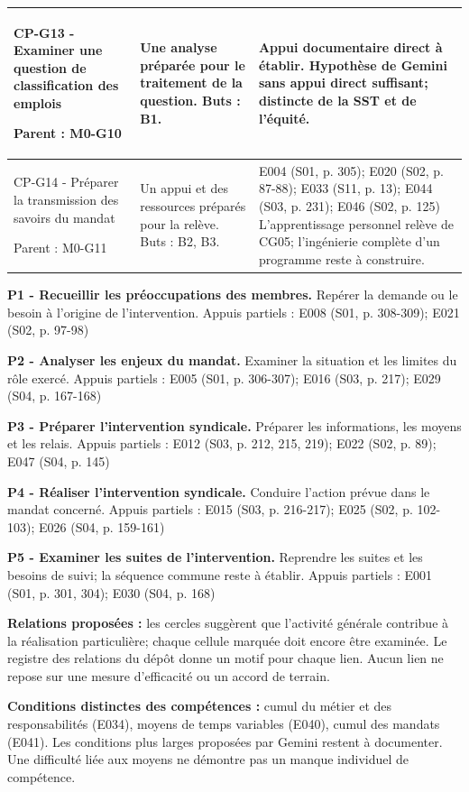 \documentclass[9pt,a4paper,landscape]{extarticle}
\begin{document}
\begin{longtable}{|p{61mm}|p{84mm}|p{115mm}|}
CP-G13 - Examiner une question de classification des emplois\par Parent : M0-G10 & Une analyse préparée pour le traitement de la question. Buts : B1. & Appui documentaire direct à établir. Hypothèse de Gemini sans appui direct suffisant; distincte de la SST et de l’équité.\\\hline
CP-G14 - Préparer la transmission des savoirs du mandat\par Parent : M0-G11 & Un appui et des ressources préparés pour la relève. Buts : B2, B3. & E004 (S01, p. 305); E020 (S02, p. 87-88); E033 (S11, p. 13); E044 (S03, p. 231); E046 (S02, p. 125) L’apprentissage personnel relève de CG05; l’ingénierie complète d’un programme reste à construire.\\\hline
\end{longtable}
\par
\textbf{P1 - Recueillir les préoccupations des membres.} Repérer la demande ou le besoin à l’origine de l’intervention. Appuis partiels : E008 (S01, p. 308-309); E021 (S02, p. 97-98)\par
\textbf{P2 - Analyser les enjeux du mandat.} Examiner la situation et les limites du rôle exercé. Appuis partiels : E005 (S01, p. 306-307); E016 (S03, p. 217); E029 (S04, p. 167-168)\par
\textbf{P3 - Préparer l’intervention syndicale.} Préparer les informations, les moyens et les relais. Appuis partiels : E012 (S03, p. 212, 215, 219); E022 (S02, p. 89); E047 (S04, p. 145)\par
\textbf{P4 - Réaliser l’intervention syndicale.} Conduire l’action prévue dans le mandat concerné. Appuis partiels : E015 (S03, p. 216-217); E025 (S02, p. 102-103); E026 (S04, p. 159-161)\par
\textbf{P5 - Examiner les suites de l’intervention.} Reprendre les suites et les besoins de suivi; la séquence commune reste à établir. Appuis partiels : E001 (S01, p. 301, 304); E030 (S04, p. 168)\par
\textbf{Relations proposées :} les cercles suggèrent que l’activité générale contribue à la réalisation particulière; chaque cellule marquée doit encore être examinée. Le registre des relations du dépôt donne un motif pour chaque lien. Aucun lien ne repose sur une mesure d’efficacité ou un accord de terrain.\par
\textbf{Conditions distinctes des compétences :} cumul du métier et des responsabilités (E034), moyens de temps variables (E040), cumul des mandats (E041). Les conditions plus larges proposées par Gemini restent à documenter. Une difficulté liée aux moyens ne démontre pas un manque individuel de compétence.\par
\end{document}
